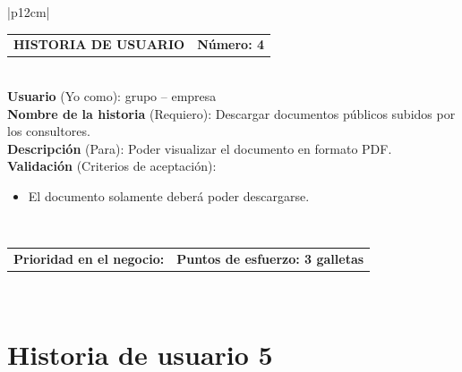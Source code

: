 \documentclass[11pt,letterpaper]{report}
\begin{document}
	\begin{center}	
		\begin{tabular}{|p{12cm}|}
			\hline
			\begin{tabular}{c|c}
				\textbf{HISTORIA DE USUARIO} & \textbf{Número: 4} \\
			\end{tabular} \\ \hline
			\textbf{Usuario} (Yo como): grupo – empresa \\ \hline
			\textbf{Nombre de la historia} (Requiero): Descargar documentos públicos subidos por los consultores. \\ \hline
			\textbf{Descripción} (Para): Poder visualizar el documento en formato PDF. \\ \hline
			\textbf{Validación} (Criterios de aceptación): \\
			\begin{minipage}{12cm}
				\begin{itemize}
					\item El documento solamente deberá poder descargarse.
				\end{itemize}
			\end{minipage} \\ \hline
			\begin{tabular}{p{6cm}|c}
				\textbf{Prioridad en el negocio: } & \textbf{Puntos de esfuerzo: 3 galletas} \\
			\end{tabular} \\ \hline
		\end{tabular}
	\end{center}
	
	\section{Historia de usuario 5}	
	
\end{document}
